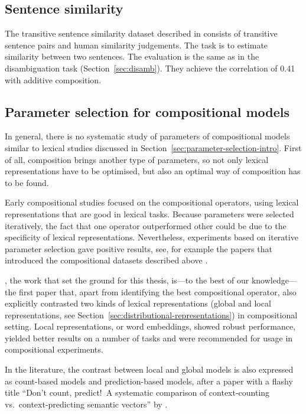\subsection{Sentence similarity}
\label{sec:sentence-similarity}

The transitive sentence similarity dataset described in  consists of transitive sentence pairs and human similarity judgements. The task is to estimate similarity between two sentences. The evaluation is the same as in the disambiguation task (Section~\ref{sec:disamb}). They achieve the correlation of 0.41 with additive composition.

\subsection{Parameter selection for compositional models}
\label{sec:comp-parameter-selection}

In general, there is no systematic study of parameters of compositional models similar to lexical studies discussed in Section~\ref{sec:parameter-selection-intro}. First of all, composition brings another type of parameters, so not only lexical representations have to be optimised, but also an optimal way of composition has to be found.

Early compositional studies focused on the compositional operators, using lexical representations that are good in lexical tasks. Because parameters were selected iteratively, the fact that one operator outperformed other could be due to the specificity of lexical representations. Nevertheless, experiments based on iterative parameter selection gave positive results, see, for example the papers that introduced the compositional datasets described above \citet{Grefenstette:2011:ETV:2140490.2140497,kartsaklis-sadrzadeh-pulman:2013:CoNLL-2013}.

\citet{milajevs-EtAl:2014:EMNLP2014}, the work that set the ground for this thesis, is---to the best of our knowledge---the first paper that, apart from identifying the best compositional operator, also  explicitly contrasted two kinds of lexical representations (global and local representations, see Section~\ref{sec:distributional-representations}) in compositional setting. Local representations, or word embeddings, showed robust performance, yielded better results on a number of tasks and were recommended for usage in compositional experiments.

In the literature, the contrast between local and global models is also expressed as count-based models and prediction-based models, after a paper with a flashy title ``Don’t count, predict!~A systematic comparison of context-counting vs.~context-predicting semantic vectors'' by \citet{baroni-dinu-kruszewski:2014:P14-1}.

